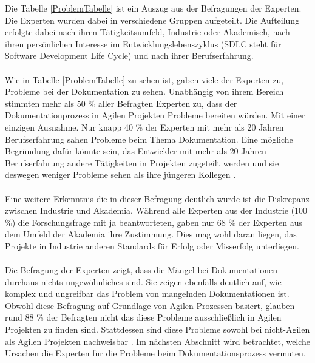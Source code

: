 \documentclass[a4paper,12pt]{scrartcl}
\begin{document}
Die Tabelle \ref{ProblemTabelle} ist ein Auszug aus der Befragungen der Experten. Die Experten wurden dabei in verschiedene Gruppen aufgeteilt. Die Aufteilung erfolgte dabei nach ihren Tätigkeitsumfeld, Industrie oder Akademisch, nach ihren persönlichen Interesse im Entwicklungslebenszyklus (SDLC steht für Software Development Life Cycle) und nach ihrer Berufserfahrung.
\\\\
Wie in Tabelle \ref{ProblemTabelle} zu sehen ist, gaben viele der Experten zu, Probleme bei der Dokumentation zu sehen. Unabhängig von ihrem Bereich stimmten mehr als 50 \% aller Befragten Experten zu, dass der Dokumentationprozess in Agilen Projekten Probleme bereiten würden. Mit einer einzigen Ausnahme. Nur knapp 40 \% der Experten mit mehr als 20 Jahren Berufserfahrung sahen Probleme beim Thema Dokumentation. Eine mögliche Begründung dafür könnte sein, das Entwickler mit mehr als 20 Jahren Berufserfahrung andere Tätigkeiten in Projekten zugeteilt werden und sie deswegen weniger Probleme sehen als ihre jüngeren Kollegen \cite{Prause2012}.
\\\\
Eine weitere Erkenntnis die in dieser Befragung deutlich wurde ist die Diskrepanz zwischen Industrie und Akademia. Während alle Experten aus der Industrie (100 \%) die Forschungsfrage mit ja beantworteten, gaben nur 68 \% der Experten aus dem Umfeld der Akademia ihre Zustimmung. Dies mag wohl daran liegen, das Projekte in Industrie anderen Standards für Erfolg oder Misserfolg unterliegen.
\\\\
Die Befragung der Experten zeigt, dass die Mängel bei Dokumentationen durchaus nichts ungewöhnliches sind. Sie zeigen ebenfalls deutlich auf, wie komplex und ungreifbar das Problem von mangelnden Dokumentationen ist. Obwohl diese Befragung auf Grundlage von Agilen Prozessen basiert, glauben rund 88 \% der Befragten nicht das diese Probleme ausschließlich in Agilen Projekten zu finden sind. Stattdessen sind diese Probleme sowohl bei nicht-Agilen als Agilen Projekten nachweisbar \cite{Prause2012}. Im nächsten Abschnitt wird betrachtet, welche Ursachen die Experten für die Probleme beim Dokumentationsprozess vermuten.
\end{document}
